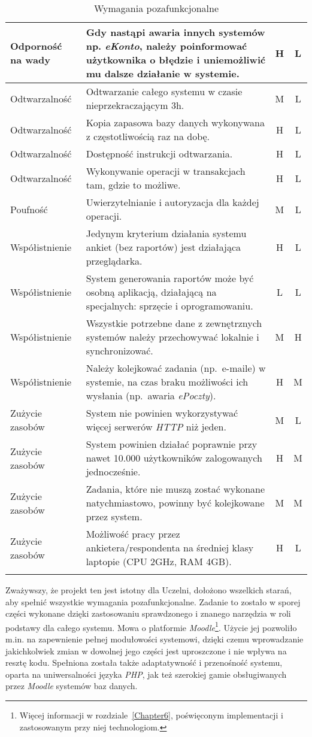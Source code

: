\begin{center}
\begin{longtable}{ | p{4cm} | p{9cm} | c | c | }
%
Odporność na wady & Gdy nastąpi awaria innych systemów np. \textit{eKonto}, należy poinformować użytkownika o błędzie i uniemożliwić mu dalsze działanie w systemie. & H & L \\ \hline
%
Odtwarzalność & Odtwarzanie całego systemu w czasie nieprzekraczającym 3h. & M & L \\ \hline
Odtwarzalność & Kopia zapasowa bazy danych wykonywana z częstotliwością raz na dobę. & H & L \\ \hline
Odtwarzalność & Dostępność instrukcji odtwarzania. & H & L \\ \hline
Odtwarzalność & Wykonywanie operacji w transakcjach tam, gdzie to możliwe. & H & L \\ \hline
%
Poufność & Uwierzytelnianie i autoryzacja dla każdej operacji. & M & L \\ \hline
%
Współistnienie & Jedynym kryterium działania systemu ankiet (bez raportów) jest działająca przeglądarka. & H & L \\ \hline
Współistnienie & System generowania raportów może być osobną aplikacją, działającą na specjalnych: sprzęcie i oprogramowaniu. & L & L \\ \hline
Współistnienie & Wszystkie potrzebne dane z zewnętrznych systemów należy przechowywać lokalnie i synchronizować. & M & H \\ \hline
Współistnienie & Należy kolejkować zadania (np.~e-maile) w systemie, na czas braku możliwości ich wysłania (np.~awaria \textit{ePoczty}). & H & M \\ \hline
%
Zużycie zasobów & System nie powinien wykorzystywać więcej serwerów \textit{HTTP} niż jeden. & M & L \\ \hline
Zużycie zasobów & System powinien działać poprawnie przy nawet 10.000 użytkowników zalogowanych jednocześnie. & H & M \\ \hline
Zużycie zasobów & Zadania, które nie muszą zostać wykonane natychmiastowo, powinny być kolejkowane przez system. & M & M \\ \hline
Zużycie zasobów & Możliwość pracy przez ankietera\slash respondenta na średniej klasy laptopie (CPU 2GHz, RAM 4GB). & H & L \\ \hline
%
\caption{Wymagania pozafunkcjonalne}\label{tab:reqs}
\end{longtable}
\end{center}

Zważywszy, że projekt ten jest istotny dla Uczelni, dołożono wszelkich starań, aby spełnić wszystkie wymagania pozafunkcjonalne. Zadanie to zostało w sporej części wykonane dzięki zastosowaniu sprawdzonego i znanego narzędzia w roli podstawy dla całego systemu. Mowa o platformie \textit{Moodle}\footnote{Więcej informacji w rozdziale~\ref{Chapter6}, poświęconym implementacji i zastosowanym przy niej technologiom.}. Użycie jej pozwoliło m.in. na zapewnienie pełnej modułowości systemowi, dzięki czemu wprowadzanie jakichkolwiek zmian w dowolnej jego części jest uproszczone i nie wpływa na resztę kodu. Spełniona została także adaptatywność i przenośność systemu, oparta na uniwersalności języka \textit{PHP}, jak też szerokiej gamie obsługiwanych przez \textit{Moodle} systemów baz danych. \\

